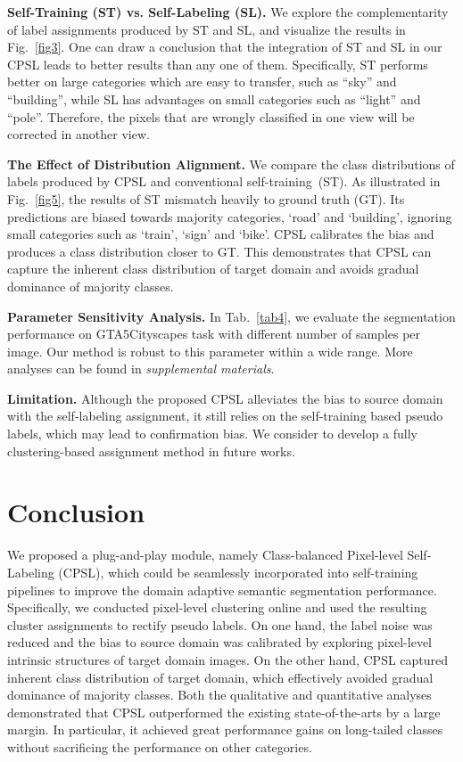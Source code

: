 \documentclass[10pt,twocolumn,letterpaper]{article}
\begin{document}
	\vspace{0.1em}	\noindent\textbf{Self-Training (ST) vs. Self-Labeling (SL).} We explore the complementarity of label assignments produced by ST and SL, and visualize the results in Fig.~\ref{fig3}. One can draw a conclusion that the integration of ST and SL in our CPSL leads to better results than any one of them. Specifically, ST performs better on large categories which are easy to transfer, such as ``sky'' and ``building'', while SL has advantages on small categories such as ``light'' and ``pole''. Therefore, the pixels that are wrongly classified in one view will be corrected in another view.
	
	\vspace{0.1em}\noindent\textbf{The Effect of Distribution Alignment.} We compare the class distributions of labels produced by CPSL and conventional self-training~(ST). As illustrated in Fig.~\ref{fig5}, the results of ST mismatch heavily to ground truth (GT). Its predictions are biased towards majority categories, \eg `road' and `building', ignoring small categories such as `train', `sign' and `bike'. CPSL calibrates the bias and produces a class distribution closer to GT. This demonstrates that CPSL can capture the inherent class distribution of target domain and avoids gradual dominance of majority classes.
	
	\vspace{0.1em}\noindent\textbf{Parameter Sensitivity Analysis.} In Tab.~\ref{tab4}, we evaluate the segmentation performance on GTA5Cityscapes task with different number of samples per image. Our method is robust to this parameter within a wide range. More analyses can be found in \textit{supplemental materials}. 
	
	\vspace{0.1em}\noindent\textbf{Limitation.} Although the proposed CPSL alleviates the bias to source domain with the self-labeling assignment, it still relies on the self-training based pseudo labels, which may lead to confirmation bias. We consider to develop a fully clustering-based assignment method in future works.
	
	\section{Conclusion}
	We proposed a plug-and-play module, namely Class-balanced Pixel-level Self-Labeling (CPSL), which could be seamlessly incorporated into self-training pipelines to improve the domain adaptive semantic segmentation performance. Specifically, we conducted pixel-level clustering online and used the resulting cluster assignments to rectify pseudo labels. On one hand, the label noise was reduced and the bias to source domain was calibrated by exploring pixel-level intrinsic structures of target domain images. On the other hand, CPSL captured inherent class distribution of target domain, which effectively avoided gradual dominance of majority classes. Both the qualitative and quantitative analyses demonstrated that CPSL outperformed the existing state-of-the-arts by a large margin. In particular, it achieved great performance gains on long-tailed classes without sacrificing the performance on other categories.
	
\end{document}
